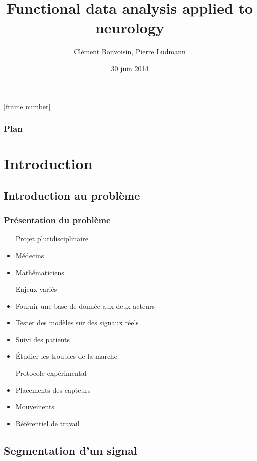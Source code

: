 \documentclass{beamer}
\begin{document}
[frame number]

\title[Signal segmentation]{Functional data analysis applied to neurology}
\author{Clément Bonvoisin, Pierre Ludmann}
\date{30 juin 2014}

\begin{frame}
\titlepage
\end{frame}

\begin{frame}
\frametitle{Plan}
  \tableofcontents[hideallsubsections]
\end{frame}



\section{Introduction}

	\subsection{Introduction au problème}

\begin{frame}
	\frametitle{Présentation du problème}
	\begin{itemize}
		\item[Projet] pluridisciplinaire
		\item Médecins
		\item Mathématiciens
		\item[Enjeux] variés
		\item Fournir une base de donnée aux deux acteurs
		\item Tester des modèles sur des signaux réels
		\item Suivi des patients
		\item Étudier les troubles de la marche
		\item[Protocole] expérimental
		\item Placements des capteurs
		\item Mouvements
		\item Référentiel de travail
	\end{itemize}	
\end{frame}

	\subsection{Segmentation d'un signal}
\end{document}
